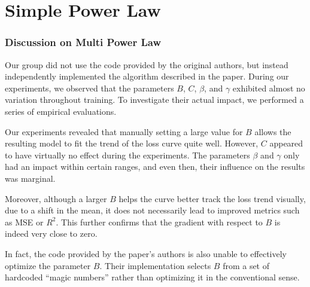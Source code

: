\documentclass[aspectratio=169]{beamer}
\begin{document}
    \section{Simple Power Law}\label{sec:simplepowerlaw}

    \begin{frame}
        \frametitle{Discussion on Multi Power Law}
        Our group did not use the code provided by the original authors,
        but instead independently implemented the algorithm described in the paper.
        During our experiments, we observed that the parameters $B$, $C$,
        $\beta$, and $\gamma$ exhibited almost no variation throughout
        training. To investigate their actual impact, we performed a
        series of empirical evaluations.

        Our experiments revealed that manually setting a large value for
        $B$ allows the resulting model to fit the trend of the loss curve
        quite well. However, $C$ appeared to have virtually no effect
        during the experiments. The parameters $\beta$ and $\gamma$ only
        had an impact within certain ranges, and even then, their
        influence on the results was marginal.

        Moreover, although a larger $B$ helps the curve better track the
        loss trend visually, due to a shift in the mean, it does not
        necessarily lead to improved metrics such as MSE or $R^2$. This
        further confirms that the gradient with respect to $B$ is indeed
        very close to zero.

        In fact, the code provided by the paper’s authors is also unable
        to effectively optimize the parameter $B$. Their implementation
        selects $B$ from a set of hardcoded ``magic numbers'' rather than
        optimizing it in the conventional sense.
    \end{frame}
\end{document}
